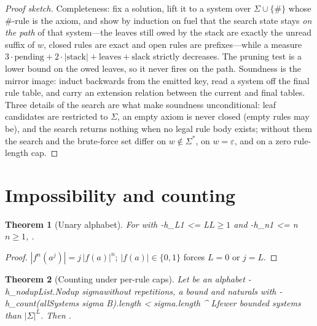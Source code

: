 \documentclass[11pt]{article}
\newtheorem{theorem}{Theorem}
\theoremstyle{definition}
\theoremstyle{remark}
\begin{document}
\begin{proof}[Proof sketch]
Completeness: fix a solution, lift it to a system over $\Sigma\cup\{\#\}$ whose $\#$-rule is
the axiom, and show by induction on fuel that the search state stays \emph{on the path} of
that system---the leaves still owed by the stack are exactly the unread suffix of $w$, closed
rules are exact and open rules are prefixes---while a measure
$3\cdot\text{pending}+2\cdot|\text{stack}|+\text{leaves}+\text{slack}$ strictly decreases.
The pruning test is a lower bound on the owed leaves, so it never fires on the path.
Soundness is the mirror image: induct backwards from the emitted key, read a system off the
final rule table, and carry an extension relation between the current and final tables.
Three details of the search are what make soundness unconditional: leaf candidates are
restricted to $\Sigma$, an empty axiom is never closed (empty rules may be), and the search
returns nothing when no legal rule body exists; without them the search and the brute-force
set differ on $w\notin\Sigma^*$, on $w=\varepsilon$, and on a zero rule-length cap.
\end{proof}

\section{Impossibility and counting}

\begin{theorem}[Unary alphabet]
For  with \hyp{h_L}{1 <= L}{$L\ge1$} and \hyp{h_n}{1 <= n}{$n\ge1$},
.
\end{theorem}
\begin{proof}
$|f^n(a^j)|=j\,|f(a)|^n$; $|f(a)|\in\{0,1\}$ forces $L=0$ or $j=L$.
\end{proof}

\begin{theorem}[Counting under per-rule caps]
Let  be an alphabet \hyp{h_nodup}{List.Nodup sigma}{without repetitions},
 a bound and  naturals with
\hyp{h_count}{(allSystems sigma B).length < sigma.length ^ L}{fewer bounded systems than $|\Sigma|^L$}.
Then .
\end{theorem}
\end{document}
